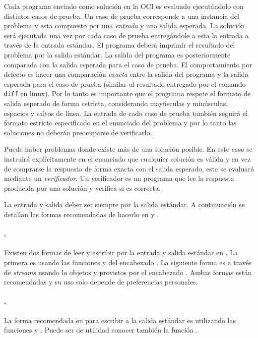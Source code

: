 Cada programa enviado como solución en la OCI es evaluado ejecutándolo con
distintos casos de prueba.
Un caso de prueba corresponde a una instancia del problema y esta compuesto por
una \emph{entrada} y una salida esperada.
La solución será ejecutada una vez por cada caso de prueba entregándole a esta
la entrada a través de la entrada estándar.
El programa deberá imprimir el resultado del problema por la salida estándar.
La salida del programa es posteriormente comparada con la salida esperada para
el caso de prueba.
El comportamiento por defecto es hacer una comparación \textit{exacta} entre la
salida del programa y la salida esperada para el caso de prueba (similar al
resultado entregado por el comando \verb|diff| en linux).
Por lo tanto es importante que el programa respete el formato de salida esperado
de forma estricta, considerando mayúsculas y minúsculas, espacios y saltos de
línea.
La entrada de cada caso de prueba también seguirá el formato estricto
especificado en el enunciado del problema y por lo tanto las soluciones no
deberán preocuparse de verificarlo.

Puede haber problemas donde existe más de una solución posible.
En este caso se instruirá explícitamente en el enunciado que cualquier solución
es válida y en vez de comprarse la respuesta de forma exacta con el salida
esperado, esta se evaluará mediante un \emph{verificador}.
Un verificador es un programa que lee la respuesta producida por una solución y
verifica si es correcta.

La entrada y salida deber ser siempre por la salida estándar.
A continuación se detallan las formas recomendadas de hacerlo en \java y \cpp.
\paragraph{\cpp.} Existen dos formas de leer y escribir por la entrada y salida
  estándar en \cpp.
  La primera es usando las funciones  y  del encabezado
  .
  La siguiente forma es a través de \textit{streams} usando lo objetos
   y  provistos por el encabezado .
  Ambas formas están recomendadas y su uso solo depende de preferencias personales.
\paragraph{\java.} La forma recomendada en \java para escribir a la salida estándar es
  utilizando las funciones  y .
  Puede ser de utilidad conocer también la función .


